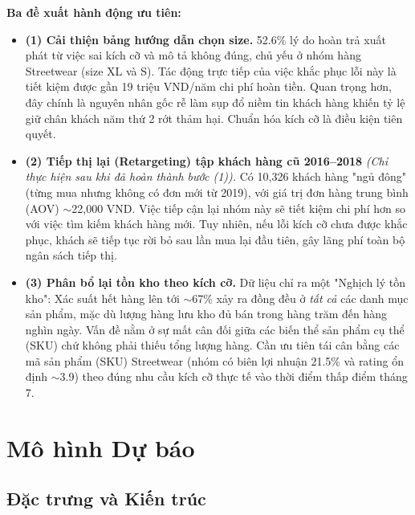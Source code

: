 \documentclass{article}
\begin{document}
\textbf{Ba đề xuất hành động ưu tiên:}
\begin{itemize}
  \item \textbf{(1) Cải thiện bảng hướng dẫn chọn size.}
    52.6\% lý do hoàn trả xuất phát từ việc sai kích cỡ và mô tả không đúng,
    chủ yếu ở nhóm hàng Streetwear (size XL và S). Tác động trực tiếp của việc khắc phục lỗi này là tiết kiệm được
    gần 19 triệu VND/năm chi phí hoàn tiền. Quan trọng hơn, đây chính là nguyên nhân gốc rễ làm sụp đổ niềm tin khách hàng 
    khiến tỷ lệ giữ chân khách năm thứ 2 rớt thảm hại. Chuẩn hóa kích cỡ là điều kiện tiên quyết.
  \item \textbf{(2) Tiếp thị lại (Retargeting) tập khách hàng cũ 2016--2018}
    \textit{(Chỉ thực hiện sau khi đã hoàn thành bước (1)).}
    Có 10,326 khách hàng "ngủ đông" (từng mua nhưng không có đơn mới từ 2019), với giá trị đơn hàng trung bình (AOV) $\sim$22,000 VND.
    Việc tiếp cận lại nhóm này sẽ tiết kiệm chi phí hơn so với việc tìm kiếm khách hàng mới. Tuy nhiên, nếu lỗi kích cỡ chưa được khắc phục, 
    khách sẽ tiếp tục rời bỏ sau lần mua lại đầu tiên, gây lãng phí toàn bộ ngân sách tiếp thị.
  \item \textbf{(3) Phân bổ lại tồn kho theo kích cỡ.}
    Dữ liệu chỉ ra một "Nghịch lý tồn kho": Xác suất hết hàng lên tới $\sim$67\% xảy ra
    đồng đều ở \textit{tất cả} các danh mục sản phẩm, mặc dù lượng hàng lưu kho đủ bán trong hàng trăm đến hàng nghìn ngày.
    Vấn đề nằm ở sự mất cân đối giữa các biến thể sản phẩm cụ thể (SKU) chứ không phải thiếu tổng lượng hàng.
    Cần ưu tiên tái cân bằng các mã sản phẩm (SKU) Streetwear (nhóm có biên lợi nhuận 21.5\% và rating ổn định $\sim$3.9)
    theo đúng nhu cầu kích cỡ thực tế vào thời điểm thấp điểm tháng 7.
\end{itemize}

\section{Mô hình Dự báo}

\subsection{Đặc trưng và Kiến trúc}
\end{document}
